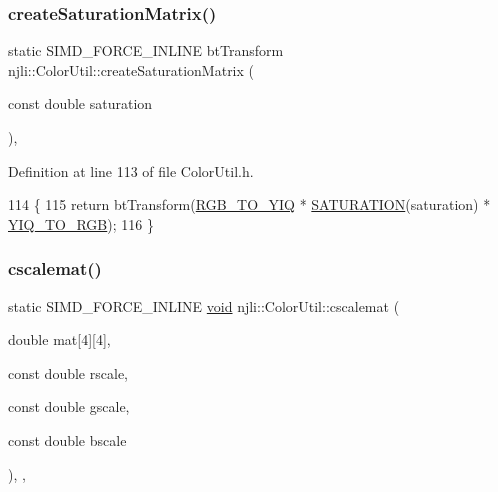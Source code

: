 \subsubsection{\texorpdfstring{create\+Saturation\+Matrix()}{createSaturationMatrix()}}
{\footnotesize\ttfamily static S\+I\+M\+D\+\_\+\+F\+O\+R\+C\+E\+\_\+\+I\+N\+L\+I\+NE bt\+Transform njli\+::\+Color\+Util\+::create\+Saturation\+Matrix (\begin{DoxyParamCaption}\item[{const double}]{saturation }\end{DoxyParamCaption})\hspace{0.3cm}{\ttfamily [inline]}, {\ttfamily [static]}}



Definition at line 113 of file Color\+Util.\+h.


\begin{DoxyCode}
114     \{
115       \textcolor{keywordflow}{return} btTransform(\mbox{\hyperlink{classnjli_1_1_color_util_ae8aa4830ab0c084398eb830628323217}{RGB\_TO\_YIQ}} * \mbox{\hyperlink{classnjli_1_1_color_util_ad4d4feb55fb385c1720dbae9ae5a0d20}{SATURATION}}(saturation) * 
      \mbox{\hyperlink{classnjli_1_1_color_util_a9b3a5642a95a4cf7fbc782ac56acba4f}{YIQ\_TO\_RGB}});
116     \}
\end{DoxyCode}
\mbox{\label{classnjli_1_1_color_util_a7b35d824b18625ef4fa732cd130cfeb3}} 
\subsubsection{\texorpdfstring{cscalemat()}{cscalemat()}}
{\footnotesize\ttfamily static S\+I\+M\+D\+\_\+\+F\+O\+R\+C\+E\+\_\+\+I\+N\+L\+I\+NE \mbox{\hyperlink{_thread_8h_af1e856da2e658414cb2456cb6f7ebc66}{void}} njli\+::\+Color\+Util\+::cscalemat (\begin{DoxyParamCaption}\item[{double}]{mat\mbox{[}4\mbox{]}\mbox{[}4\mbox{]},  }\item[{const double}]{rscale,  }\item[{const double}]{gscale,  }\item[{const double}]{bscale }\end{DoxyParamCaption})\hspace{0.3cm}{\ttfamily [inline]}, {\ttfamily [static]}, {\ttfamily [protected]}}



